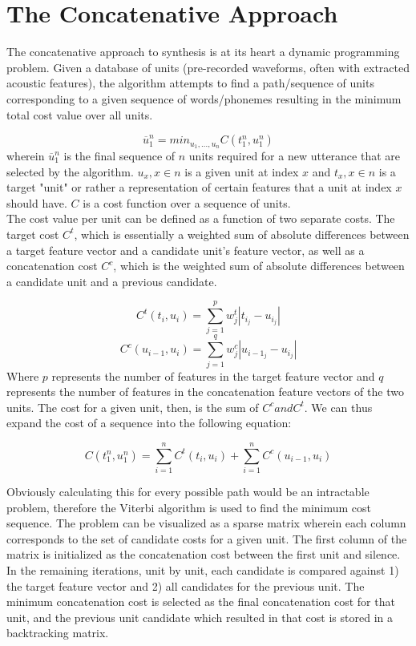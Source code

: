 \documentclass[10pt, journal, compsoc]{IEEEtran}
\begin{document}
\section{The Concatenative Approach}
The concatenative approach to synthesis is at its heart a dynamic programming problem. Given a database of units (pre-recorded waveforms, often with extracted acoustic features), the algorithm attempts to find a path/sequence of units corresponding to a given sequence of words/phonemes resulting in the minimum total cost value over all units. \par
\begin{equation}\overline{u}_1^n=min_{u_1,...,u_n}C(t_1^n,u_1^n)
\end{equation}
wherein $\overline{u}_1^n$ is the final sequence of $n$ units required for a new utterance that are selected by the algorithm. $u_x, x\in n$ is a given unit at index $x$ and $t_x, x\in n$ is a target "unit" or rather a representation of certain features that a unit at index $x$ should have. $C$ is a cost function over a sequence of units.\\	
The cost value per unit can be defined as a function of two separate costs. The target cost $C^t$, which is essentially a weighted sum of absolute differences between a target feature vector and a candidate unit's feature vector, as well as a concatenation cost $C^c$, which is the weighted sum of absolute differences between a candidate unit and a previous candidate.\par
\begin{equation}
C^t(t_i,u_i)=\sum_{j=1}^pw_j^t|t_{i_j}-u_{i_j}|
\end{equation}
\begin{equation}
C^c(u_{i-1},u_i)=\sum_{j=1}^qw_j^c|u_{i-1_j}-u_{i_j}|
\end{equation}
Where $p$ represents the number of features in the target feature vector and $q$ represents the number of features in the concatenation feature vectors of the two units. The cost for a given unit, then, is the sum of $C^c and C^t$. We can thus expand the cost of a sequence into the following equation:\par
\begin{equation}C(t_1^n,u_1^n)=\sum_{i=1}^nC^t(t_i,u_i)+ \sum_{i=1}^nC^c(u_{i-1},u_i)
\end{equation}\cite{Hunt:1996:USC:1256383.1256532}\par
Obviously calculating this for every possible path would be an intractable problem, therefore the Viterbi algorithm is used to find the minimum cost sequence. The problem can be visualized as a sparse matrix wherein each column corresponds to the set of candidate costs for a given unit. The first column of the matrix is initialized as the concatenation cost between the first unit and silence. In the remaining iterations, unit by unit, each candidate is compared against 1) the target feature vector and 2) all candidates for the previous unit. The minimum concatenation cost is selected as the final concatenation cost for that unit, and the previous unit candidate which resulted in that cost  is stored in a backtracking matrix.\par
\end{document}
